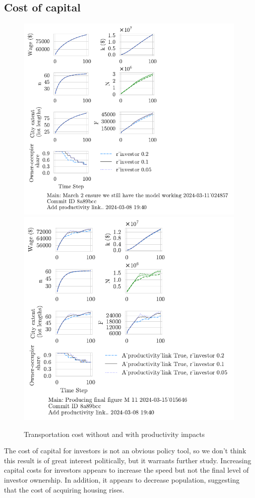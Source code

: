 \subsection{Cost of capital}
\begin{figure}[h!tb] 
    \centering
    \includegraphics[scale=.75, trim={0 1.4cm 4cm 0},clip]{fig/r_investor-Main-024857.pdf} 
    \includegraphics[scale=.75, trim={0 1.4cm 3.5cm 0},clip]{fig/With-productivity_link-r_investor-15_015646.pdf} 
    \caption{Transportation cost without and with productivity impacts}
    \label{fig:Productivity_link_W-WO-Cost-of-capital}
\end{figure}
The cost of capital for investors is not an obvious policy tool, so we don't think this result is of great interest politically, but it warrants further study. Increasing capital costs for investors appears to increase the speed but not the final level of investor ownership.  In addition, it appears to decrease population, suggesting that the cost of acquiring housing rises. 

